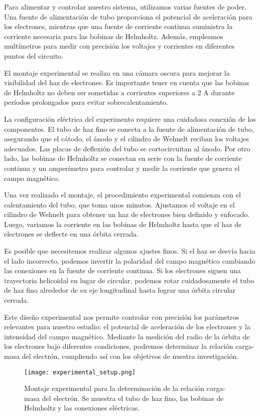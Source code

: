 \documentclass[twocolumn,a4paper,11pt]{scrartcl}
\begin{document}
Para alimentar y controlar nuestro sistema, utilizamos varias fuentes de poder. Una fuente de alimentación de tubo proporciona el potencial de aceleración para los electrones, mientras que una fuente de corriente continua suministra la corriente necesaria para las bobinas de Helmholtz. Además, empleamos multímetros para medir con precisión los voltajes y corrientes en diferentes puntos del circuito.

El montaje experimental se realiza en una cámara oscura para mejorar la visibilidad del haz de electrones. Es importante tener en cuenta que las bobinas de Helmholtz no deben ser sometidas a corrientes superiores a 2 A durante períodos prolongados para evitar sobrecalentamiento.

La configuración eléctrica del experimento requiere una cuidadosa conexión de los componentes. El tubo de haz fino se conecta a la fuente de alimentación de tubo, asegurando que el cátodo, el ánodo y el cilindro de Wehnelt reciban los voltajes adecuados. Las placas de deflexión del tubo se cortocircuitan al ánodo. Por otro lado, las bobinas de Helmholtz se conectan en serie con la fuente de corriente continua y un amperímetro para controlar y medir la corriente que genera el campo magnético.

Una vez realizado el montaje, el procedimiento experimental comienza con el calentamiento del tubo, que toma unos minutos. Ajustamos el voltaje en el cilindro de Wehnelt para obtener un haz de electrones bien definido y enfocado. Luego, variamos la corriente en las bobinas de Helmholtz hasta que el haz de electrones se deflecte en una órbita cerrada.

Es posible que necesitemos realizar algunos ajustes finos. Si el haz se desvía hacia el lado incorrecto, podemos invertir la polaridad del campo magnético cambiando las conexiones en la fuente de corriente continua. Si los electrones siguen una trayectoria helicoidal en lugar de circular, podemos rotar cuidadosamente el tubo de haz fino alrededor de su eje longitudinal hasta lograr una órbita circular cerrada.

Este diseño experimental nos permite controlar con precisión los parámetros relevantes para nuestro estudio: el potencial de aceleración de los electrones y la intensidad del campo magnético. Mediante la medición del radio de la órbita de los electrones bajo diferentes condiciones, podremos determinar la relación carga-masa del electrón, cumpliendo así con los objetivos de nuestra investigación.

\begin{figure}[h]
    \centering
    \texttt{[image: experimental\_setup.png]}
    \caption{Montaje experimental para la determinación de la relación carga-masa del electrón. Se muestra el tubo de haz fino, las bobinas de Helmholtz y las conexiones eléctricas.}
    \label{fig:experimental_setup}
\end{figure}
\end{document}
